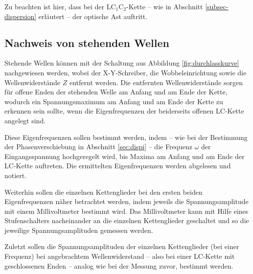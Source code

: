 Zu beachten ist hier, dass bei der LC$_1$C$_2$-Kette -- wie in Abschnitt \ref{subsec-dispersion} erläutert
-- der optische Ast auftritt.


\subsection{Nachweis von stehenden Wellen}

Stehende Wellen können mit der Schaltung aus Abbildung \ref{fig:durchlasskurve} nachgewiesen
werden, wobei der X-Y-Schreiber, die Wobbeleinrichtung sowie die Wellenwiderstände $Z$ entfernt
werden. Die entfernten Wellenwiderstände sorgen für offene Enden der stehenden Welle am Anfang
und am Ende der Kette, wodurch ein Spannungsmaximum am Anfang und am Ende der Kette zu erkennen
sein sollte, wenn die Eigenfrequenzen der beiderseits offenen LC-Kette angelegt sind.

Diese Eigenfrequenzen sollen bestimmt werden, indem -- wie bei der Bestimmung der Phasenverschiebung in Abschnitt \ref{sec:dispi} --
die Frequenz $\omega$ der Eingangsspannung hochgeregelt wird, bis Maxima am Anfang und am Ende der LC-Kette auftreten. Die ermittelten Eigenfrequenzen werden abgelesen und notiert.

Weiterhin sollen die einzelnen Kettenglieder bei den ersten beiden Eigenfrequenzen näher betrachtet werden, indem jeweils die Spannungsamplitude mit einem Millivoltmeter bestimmt wird.
Das Millivoltmeter kann mit Hilfe eines Stufenschalters nacheinander an die einzelnen
Kettenglieder geschaltet und so die jeweilige Spannungsamplituden gemessen werden.

Zuletzt sollen die Spannungsamplituden der einzelnen Kettenglieder (bei einer Frequenz) bei angebrachtem Wellenwiderstand -- also bei einer LC-Kette mit geschlossenen Enden -- analog wie bei der Messung zuvor, bestimmt werden.
